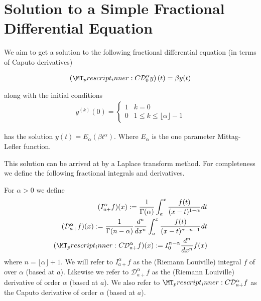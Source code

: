 \documentclass{unswmaths}
\begin{document}
\section*{Solution to a Simple Fractional Differential Equation}
We aim to get a solution to the following fractional differential equation (in terms of Caputo derivatives)

\begin{align}
	\label{eq:fde-1}
	\left( \prescript{C}{}{\mathcal{D}_0^\alpha}y \right)(t) = \beta y(t) 
\end{align}

along with the initial conditions 
\begin{align}
	\label{eq:fde-1-ic}
	y^{(k)}(0) = 
	\begin{cases}
		1 & k = 0 \\
		0 & 1 \leq k \leq \lfloor\alpha \rfloor - 1  
	\end{cases}
\end{align}

has the solution $ y(t) = E_\alpha \left( \beta t^\alpha \right) $. Where $ E_\alpha $ is the one parameter Mittag-Lefler function.

This solution can be arrived at by a Laplace transform method. For completeness we define the following fractional
integrals and derivatives.

\begin{definition}
	For $ \alpha > 0 $ we define
	\begin{align*}
		(I_{a+}^{\alpha}f)(x) := \frac{1}{\Gamma(\alpha)}\int_a^x \frac{f(t)}{(x-t)^{1 - \alpha}} dt \\
		(\mathcal{D}_{a+}^{\alpha}f)(x) := \frac{1}{\Gamma(n-\alpha)} \frac{d^n}{dx^n}\int_a^x \frac{f(t)}{(x-t)^{\alpha - n + 1}} dt \\
		(\prescript{C}{}{\mathcal{D}}_{a+}^\alpha f)(x) := I_{0}^{n-\alpha} \frac{d^n}{dx^n}f(x) 
	\end{align*}
	where $ n  = \lfloor \alpha \rfloor + 1$.
	We will refer to $ I_{a+}^\alpha f$ as the (Riemann Louiville) integral $ f $ of over $ \alpha $ (based at $ a $).
	Likewise we refer to $ \mathcal{D}_{a+}^\alpha f $ as the (Riemann Louiville) derivative of order $ \alpha $ (based at $ a $).
	We also refer to $ \prescript{C}{}{\mathcal{D}}_{a+}^\alpha f $ as the Caputo derivative of order $ \alpha $ (based at $ a $).
	
\end{definition}
\end{document}
